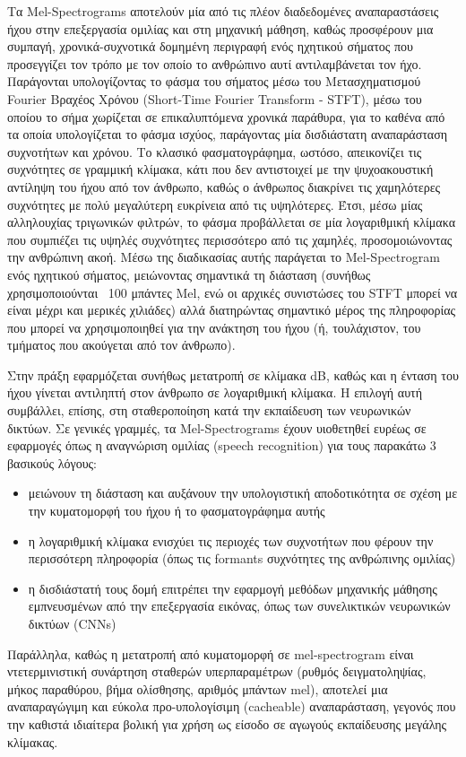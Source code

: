 Τα Mel-Spectrograms αποτελούν μία από τις πλέον διαδεδομένες αναπαραστάσεις ήχου στην επεξεργασία ομιλίας και στη μηχανική μάθηση, καθώς προσφέρουν μια συμπαγή, χρονικά-συχνοτικά δομημένη περιγραφή ενός ηχητικού σήματος που προσεγγίζει τον τρόπο με τον οποίο το ανθρώπινο αυτί αντιλαμβάνεται τον ήχο. Παράγονται υπολογίζοντας το φάσμα του σήματος μέσω του Μετασχηματισμού Fourier Βραχέος Χρόνου (Short-Time Fourier Transform - STFT), μέσω του οποίου το σήμα χωρίζεται σε επικαλυπτόμενα χρονικά παράθυρα, για το καθένα από τα οποία υπολογίζεται το φάσμα ισχύος, παράγοντας μία δισδιάστατη αναπαράσταση συχνοτήτων και χρόνου. Το κλασικό φασματογράφημα, ωστόσο, απεικονίζει τις συχνότητες σε γραμμική κλίμακα, κάτι που δεν αντιστοιχεί με την ψυχοακουστική αντίληψη του ήχου από τον άνθρωπο, καθώς ο άνθρωπος διακρίνει τις χαμηλότερες συχνότητες με πολύ μεγαλύτερη ευκρίνεια από τις υψηλότερες. Έτσι, μέσω μίας αλληλουχίας τριγωνικών φιλτρών, το φάσμα προβάλλεται σε μία λογαριθμική κλίμακα που συμπιέζει τις υψηλές συχνότητες περισσότερο από τις χαμηλές, προσομοιώνοντας την ανθρώπινη ακοή. Μέσω της διαδικασίας αυτής παράγεται το Mel-Spectrogram ενός ηχητικού σήματος, μειώνοντας σημαντικά τη διάσταση (συνήθως χρησιμοποιούνται ~100 μπάντες Mel, ενώ οι αρχικές συνιστώσες του STFT μπορεί να είναι μέχρι και μερικές χιλιάδες) αλλά διατηρώντας σημαντικό μέρος της πληροφορίας που μπορεί να χρησιμοποιηθεί για την ανάκτηση του ήχου (ή, τουλάχιστον, του τμήματος που ακούγεται από τον άνθρωπο).

Στην πράξη εφαρμόζεται συνήθως μετατροπή σε κλίμακα dB, καθώς και η ένταση του ήχου γίνεται αντιληπτή στον άνθρωπο σε λογαριθμική κλίμακα. Η επιλογή αυτή συμβάλλει, επίσης, στη σταθεροποίηση κατά την εκπαίδευση των νευρωνικών δικτύων. Σε γενικές γραμμές, τα Mel-Spectrograms έχουν υιοθετηθεί ευρέως σε εφαρμογές όπως η αναγνώριση ομιλίας (speech recognition) για τους παρακάτω 3 βασικούς λόγους:

\begin{itemize}
\item μειώνουν τη διάσταση και αυξάνουν την υπολογιστική αποδοτικότητα σε σχέση με την κυματομορφή του ήχου ή το φασματογράφημα αυτής

\item η λογαριθμική κλίμακα ενισχύει τις περιοχές των συχνοτήτων που φέρουν την περισσότερη πληροφορία (όπως τις formants συχνότητες της ανθρώπινης ομιλίας)

\item η δισδιάστατή τους δομή επιτρέπει την εφαρμογή μεθόδων μηχανικής μάθησης εμπνευσμένων από την επεξεργασία εικόνας, όπως των συνελικτικών νευρωνικών δικτύων (CNNs)
\end{itemize}

Παράλληλα, καθώς η μετατροπή από κυματομορφή σε mel-spectrogram είναι ντετερμινιστική συνάρτηση σταθερών υπερπαραμέτρων (ρυθμός δειγματοληψίας, μήκος παραθύρου, βήμα ολίσθησης, αριθμός μπάντων mel), αποτελεί μια αναπαραγώγιμη και εύκολα προ-υπολογίσιμη (cacheable) αναπαράσταση, γεγονός που την καθιστά ιδιαίτερα βολική για χρήση ως είσοδο σε αγωγούς εκπαίδευσης μεγάλης κλίμακας.